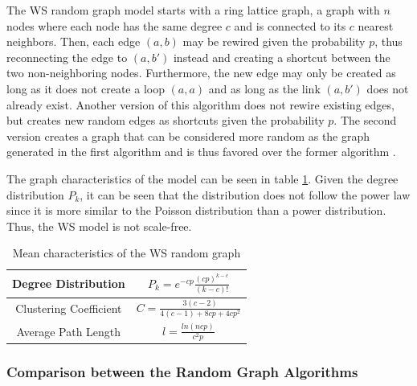 The WS random graph model starts with a ring lattice graph, a graph 
with $n$ nodes where each node has the same degree $c$ and 
is connected to its $c$ nearest neighbors. Then, each edge $(a, b)$
may be rewired given the probability $p$, thus reconnecting the edge to  $(a, b')$
instead and creating a shortcut between the two non-neighboring nodes.
Furthermore, the new edge may only be created as long as it does not create
a loop $(a, a)$ and as long as the link $(a, b')$ does not already exist.
Another version of this algorithm does not rewire existing edges,
but creates new random edges as shortcuts given the probability $p$.
The second version creates a graph that can be considered more 
\glqq random\grqq{} as the graph generated in the first algorithm and is
thus favored over the former algorithm \cite{basicnetwork}.

The graph characteristics of the model can be seen
in table \ref{ws-model}. Given the degree distribution $P_k$, it can be seen
that the distribution does not follow the power law since it is more similar
to the Poisson distribution than a power distribution. Thus, the WS model
is not scale-free.

\begin{table}[ht!]
    \centering
    \begin{tabular}{|c | c |} 
     \hline
     Degree Distribution & 
     $P_k = e^{-cp}\frac{(cp)^{k-c}}{(k-c)!}$ \\ 
     \hline
     Clustering Coefficient & 
     $C=\frac{3(c-2)}{4(c-1) + 8cp +4cp^2}$ \\ 
     \hline
     Average Path Length & $l = \frac{ln(ncp)}{c^2p}$ \\ 
     \hline
    \end{tabular}
    \caption{Mean characteristics of the WS random graph \cite{basicnetwork}}
    \label{ws-model}
\end{table}



\subsubsection{Comparison between the Random Graph Algorithms}

